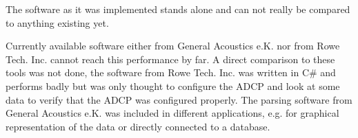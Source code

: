 The software as it was implemented stands alone and can not really be compared to anything existing yet. 

 Currently available software either from General Acoustics e.K. nor from Rowe Tech. Inc. cannot reach this performance by far. A direct comparison to these tools was not done, the software from Rowe Tech. Inc. was written in C\# and performs badly but was only thought to configure the ADCP and look at some data to verify that the ADCP was configured properly. The parsing software from General Acoustics e.K. was included in different applications, e.g. for graphical representation of the data or directly connected to a database.   